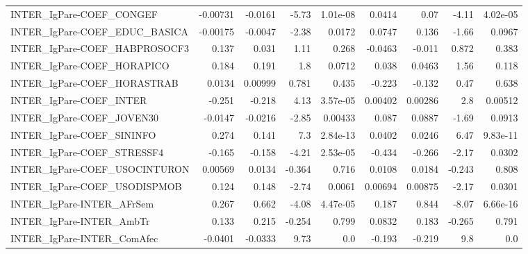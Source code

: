 \begin{tabular}{lrrrrrrrr}
INTER\_IgPare-COEF\_CONGEF               &    -0.00731 &      -0.0161 &   -5.73 & 1.01e-08 &     0.0414 &        0.07 &        -4.11 &      4.02e-05 \\
INTER\_IgPare-COEF\_EDUC\_BASICA          &    -0.00175 &      -0.0047 &   -2.38 &   0.0172 &     0.0747 &       0.136 &        -1.66 &        0.0967 \\
INTER\_IgPare-COEF\_HABPROSOCF3          &       0.137 &        0.031 &    1.11 &    0.268 &    -0.0463 &      -0.011 &        0.872 &         0.383 \\
INTER\_IgPare-COEF\_HORAPICO             &       0.184 &        0.191 &     1.8 &   0.0712 &      0.038 &      0.0463 &         1.56 &         0.118 \\
INTER\_IgPare-COEF\_HORASTRAB            &      0.0134 &      0.00999 &   0.781 &    0.435 &     -0.223 &      -0.132 &         0.47 &         0.638 \\
INTER\_IgPare-COEF\_INTER                &      -0.251 &       -0.218 &    4.13 & 3.57e-05 &    0.00402 &     0.00286 &          2.8 &       0.00512 \\
INTER\_IgPare-COEF\_JOVEN30              &     -0.0147 &      -0.0216 &   -2.85 &  0.00433 &      0.087 &      0.0887 &        -1.69 &        0.0913 \\
INTER\_IgPare-COEF\_SININFO              &       0.274 &        0.141 &     7.3 & 2.84e-13 &     0.0402 &      0.0246 &         6.47 &      9.83e-11 \\
INTER\_IgPare-COEF\_STRESSF4             &      -0.165 &       -0.158 &   -4.21 & 2.53e-05 &     -0.434 &      -0.266 &        -2.17 &        0.0302 \\
INTER\_IgPare-COEF\_USOCINTURON          &     0.00569 &       0.0134 &  -0.364 &    0.716 &     0.0108 &      0.0184 &       -0.243 &         0.808 \\
INTER\_IgPare-COEF\_USODISPMOB           &       0.124 &        0.148 &   -2.74 &   0.0061 &    0.00694 &     0.00875 &        -2.17 &        0.0301 \\
INTER\_IgPare-INTER\_AFrSem              &       0.267 &        0.662 &   -4.08 & 4.47e-05 &      0.187 &       0.844 &        -8.07 &      6.66e-16 \\
INTER\_IgPare-INTER\_AmbTr               &       0.133 &        0.215 &  -0.254 &    0.799 &     0.0832 &       0.183 &       -0.265 &         0.791 \\
INTER\_IgPare-INTER\_ComAfec             &     -0.0401 &      -0.0333 &    9.73 &      0.0 &     -0.193 &      -0.219 &          9.8 &           0.0 \\

\end{tabular}
